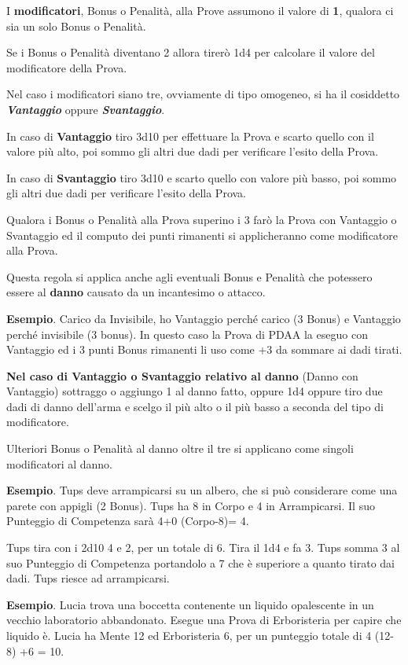 \documentclass[12pt,a4paper,twoside,openany]{book}
\begin{document}
\begin{multicols}{2}
I \textbf{modificatori}, Bonus o Penalità, alla Prove assumono il valore di \textbf{1}, qualora ci sia un solo Bonus o Penalità.

Se i Bonus o Penalità diventano 2 allora tirerò 1d4 per calcolare il valore del modificatore della Prova.

Nel caso i modificatori siano tre, ovviamente di tipo omogeneo, si ha il cosiddetto \textbf{\textit{Vantaggio}} oppure \textbf{\textit{Svantaggio}}.

In caso di \textbf{Vantaggio} tiro 3d10 per effettuare la Prova e scarto quello con il valore più alto, poi sommo gli altri due dadi per verificare l'esito della Prova.

In caso di \textbf{Svantaggio} tiro 3d10 e scarto quello con valore più basso, poi sommo gli altri due dadi per verificare l'esito della Prova.

Qualora i Bonus o Penalità alla Prova superino i 3 farò la Prova con Vantaggio o Svantaggio ed il computo dei punti rimanenti si applicheranno come modificatore alla Prova.

Questa regola si applica anche agli eventuali Bonus e Penalità che potessero essere al \textbf{danno} causato da un incantesimo o attacco.

\textbf{Esempio}. Carico da Invisibile, ho Vantaggio perché carico (3 Bonus) e Vantaggio perché invisibile (3 bonus). In questo caso la Prova di PDAA la eseguo con Vantaggio ed i 3 punti Bonus rimanenti li uso come +3 da sommare ai dadi tirati.

\textbf{Nel caso di Vantaggio o Svantaggio relativo al danno} \index(Danno con Vantaggio) sottraggo o aggiungo 1 al danno fatto, oppure 1d4 oppure tiro due dadi di danno dell'arma e scelgo il più alto o il più basso a seconda del tipo di modificatore.

Ulteriori Bonus o Penalità al danno oltre il tre si applicano come singoli modificatori al danno.

\textbf{Esempio}. Tups deve arrampicarsi su un albero, che si può considerare come una parete con appigli (2 Bonus).
Tups ha 8 in Corpo e 4 in Arrampicarsi.
Il suo Punteggio di Competenza sarà 4+0 (Corpo-8)= 4.

Tups tira con i 2d10 4 e 2, per un totale di 6. Tira il 1d4 e fa 3.
Tups somma 3 al suo Punteggio di Competenza portandolo a 7 che è superiore a quanto tirato dai dadi. Tups riesce ad arrampicarsi.

\textbf{Esempio}. Lucia trova una boccetta contenente un liquido opalescente in un vecchio laboratorio abbandonato.
Esegue una Prova di Erboristeria per capire che liquido è.
Lucia ha Mente 12 ed Erboristeria 6, per un punteggio totale di 4 (12-8) +6 = 10.


\end{multicols}
\end{document}
